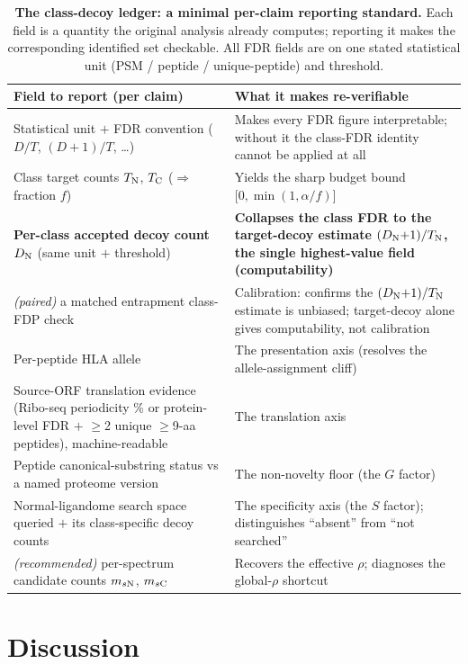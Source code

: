 \begin{table}[tbp]\centering
\caption{\textbf{The class-decoy ledger: a minimal per-claim reporting standard.} Each field is a quantity the original analysis already computes; reporting it makes the corresponding identified set checkable. All FDR fields are on one stated statistical unit (PSM / peptide / unique-peptide) and threshold.}
\label{tab:ledger}
\footnotesize\setlength{\extrarowheight}{3.5pt}
\begin{tabularx}{\textwidth}{@{}>{\raggedright\arraybackslash}p{}>{\raggedright\arraybackslash}X@{}}
\toprule
\textbf{Field to report (per claim)} & \textbf{What it makes re-verifiable} \\
\midrule
Statistical unit $+$ FDR convention ($D/T$, $(D{+}1)/T$, \ldots) & Makes every FDR figure interpretable; without it the class-FDR identity cannot be applied at all \\
Class target counts $T_{\mathrm{N}}$, $T_{\mathrm{C}}$ ($\Rightarrow$ fraction $f$) & Yields the sharp budget bound $\bigl[0,\min(1,\alpha/f)\bigr]$ \\
\textbf{Per-class accepted decoy count $D_{\mathrm{N}}$} (same unit $+$ threshold) & \textbf{Collapses the class FDR to the target-decoy estimate $(D_{\mathrm{N}}{+}1)/T_{\mathrm{N}}$, the single highest-value field (computability)} \\
\emph{(paired)} a matched entrapment class-FDP check & Calibration: confirms the $(D_{\mathrm{N}}{+}1)/T_{\mathrm{N}}$ estimate is unbiased; target-decoy alone gives computability, not calibration \\
Per-peptide HLA allele & The presentation axis (resolves the allele-assignment cliff) \\
Source-ORF translation evidence (Ribo-seq periodicity \% or protein-level FDR $+$ $\ge$2 unique $\ge$9-aa peptides), machine-readable & The translation axis \\
Peptide canonical-substring status vs a named proteome version & The non-novelty floor (the $G$ factor) \\
Normal-ligandome search space queried $+$ its class-specific decoy counts & The specificity axis (the $S$ factor); distinguishes ``absent'' from ``not searched'' \\
\emph{(recommended)} per-spectrum candidate counts $m_{s\mathrm{N}}$, $m_{s\mathrm{C}}$ & Recovers the effective $\rho$; diagnoses the global-$\rho$ shortcut \\
\bottomrule
\end{tabularx}
\end{table}

\section{Discussion}

